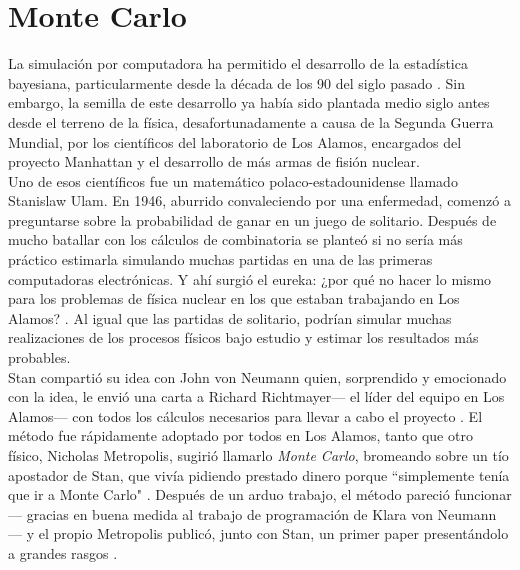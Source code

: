 \section{Monte Carlo} 

La simulación por computadora ha permitido el desarrollo de la estadística bayesiana, particularmente desde la década de los 90 del siglo pasado \parencite{RobertCasella11}. Sin embargo, la semilla de este desarrollo ya había sido plantada medio siglo antes desde el terreno de la física, desafortunadamente a causa de la Segunda Guerra Mundial, por los científicos del laboratorio de Los Alamos, encargados del proyecto Manhattan y el desarrollo de más armas de fisión nuclear.\\

Uno de esos científicos fue un matemático polaco-estadounidense llamado Stanislaw Ulam. En 1946, aburrido convaleciendo por una enfermedad, comenzó a preguntarse sobre la probabilidad de ganar en un juego de solitario. Después de mucho batallar con los cálculos de combinatoria se planteó si no sería más práctico estimarla simulando muchas partidas en una de las primeras computadoras electrónicas. Y ahí surgió el eureka: ¿por qué no hacer lo mismo para los problemas de física nuclear en los que estaban trabajando en Los Alamos? \parencite{Eckhardt87}. Al igual que las partidas de solitario, podrían simular muchas realizaciones de los procesos físicos bajo estudio y estimar los resultados más probables.\\ 

Stan compartió su idea con John von Neumann quien, sorprendido y emocionado con la idea, le envió una carta a Richard Richtmayer--- el líder del equipo en Los Alamos--- con todos los cálculos necesarios para llevar a cabo el proyecto \parencite{vonNeumann47}. El método fue rápidamente adoptado por todos en Los Alamos, tanto que otro físico, Nicholas Metropolis, sugirió llamarlo \textit{Monte Carlo}, bromeando sobre un tío apostador de Stan, que vivía pidiendo prestado dinero porque ``simplemente tenía que ir a Monte Carlo" \parencite{Metropolis87}. Después de un arduo trabajo, el método pareció funcionar--- gracias en buena medida al trabajo de programación de Klara von Neumann \parencite{Haigh14}--- y el propio Metropolis publicó, junto con Stan, un primer paper presentándolo a grandes rasgos \parencite{MetropolisUlam49}.\\

